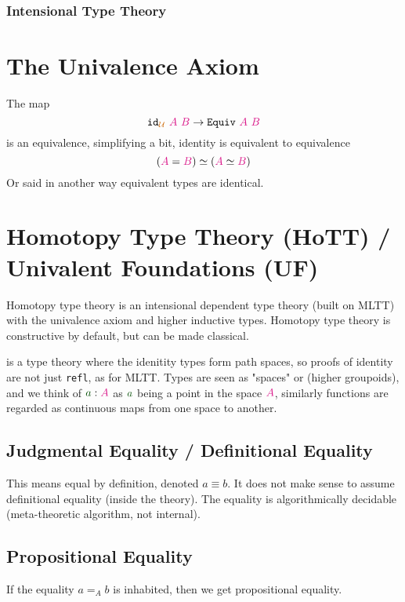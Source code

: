 \documentclass[twoside,11pt,openright]{report}
\theoremstyle{plain} %
\theoremstyle{definition}
\theoremstyle{remark}
\newcommand*{\term}[1]{\textcolor{green!30!black}{#1}} %
\newcommand*{\type}[1]{\textcolor{magenta!90!black}{#1}}
\newcommand*{\universe}[1]{\textcolor{orange!80!black}{#1}}
\newcommand*{\typeformer}[1]{\ensuremath{\mathtt{#1}}}
\begin{document}
\subsubsection{Intensional Type Theory}

\section{The Univalence Axiom}
The map
\begin{equation}
  \typeformer{id}_{\universe{\mathcal{U}}}~\type{A}~\type{B} \rightarrow \typeformer{Equiv}~\type{A}~\type{B}
\end{equation}
is an equivalence, simplifying a bit, identity is equivalent to equivalence
\begin{equation}
  (\type{A} = \type{B}) \simeq (\type{A} \simeq \type{B})
\end{equation}
Or said in another way equivalent types are identical.

\section{Homotopy Type Theory (HoTT) / Univalent Foundations (UF)}
Homotopy type theory is an intensional dependent type theory (built on MLTT) with the univalence axiom and higher inductive types. Homotopy type theory is constructive by default, but can be made classical.

is a type theory where the idenitity types form path spaces, so proofs of identity are not just \texttt{refl}, as for MLTT. Types are seen as "spaces" or (higher groupoids), and we think of \(\term{a} : \type{A}\) as \(\term{a}\) being a point in the space \(\type{A}\), similarly functions are regarded as continuous maps from one space to another. \cite{nlab:homotopy_type_theory}

\subsection{Judgmental Equality / Definitional Equality}
This means equal by definition, denoted \(a \equiv b\). It does not make sense to assume definitional equality (inside the theory). The equality is algorithmically decidable (meta-theoretic algorithm, not internal). 

\subsection{Propositional Equality}
If the equality \(a =_{A} b\) is inhabited, then we get propositional equality.
\end{document}
